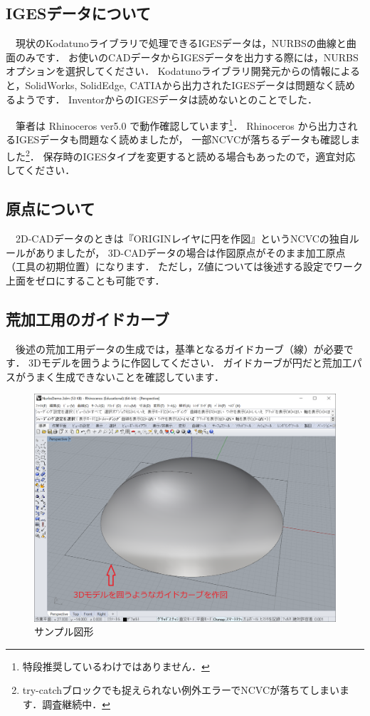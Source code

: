 \subsection{IGESデータについて}
\label{sec:AboutIGES}
　現状のKodatunoライブラリで処理できるIGESデータは，NURBSの曲線と曲面のみです．
お使いのCADデータからIGESデータを出力する際には，NURBSオプションを選択してください．
Kodatunoライブラリ開発元からの情報によると，SolidWorks, SolidEdge, CATIAから出力されたIGESデータは問題なく読めるようです．
InventorからのIGESデータは読めないとのことでした．

　筆者は Rhinoceros ver5.0 で動作確認しています\footnote{特段推奨しているわけではありません．}．
Rhinoceros から出力されるIGESデータも問題なく読めましたが，
一部NCVCが落ちるデータも確認しました\footnote{try-catchブロックでも捉えられない例外エラーでNCVCが落ちてしまいます．調査継続中．}．
保存時のIGESタイプを変更すると読める場合もあったので，適宜対応してください．

\subsection{原点について}
　2D-CADデータのときは『ORIGINレイヤに円を作図』というNCVCの独自ルールがありましたが，
3D-CADデータの場合は作図原点がそのまま加工原点（工具の初期位置）になります．
ただし，Z値については後述する設定でワーク上面をゼロにすることも可能です．

\subsection{荒加工用のガイドカーブ}
　後述の荒加工用データの生成では，基準となるガイドカーブ（線）が必要です．
3Dモデルを囲うように作図してください．
ガイドカーブが円だと荒加工パスがうまく生成できないことを確認しています．

\begin{figure}[H]
\centering
\includegraphics[scale=0.5]{No1/fig/fig11.png}
\caption{サンプル図形}
\label{fig:sample.iges}
\end{figure}

